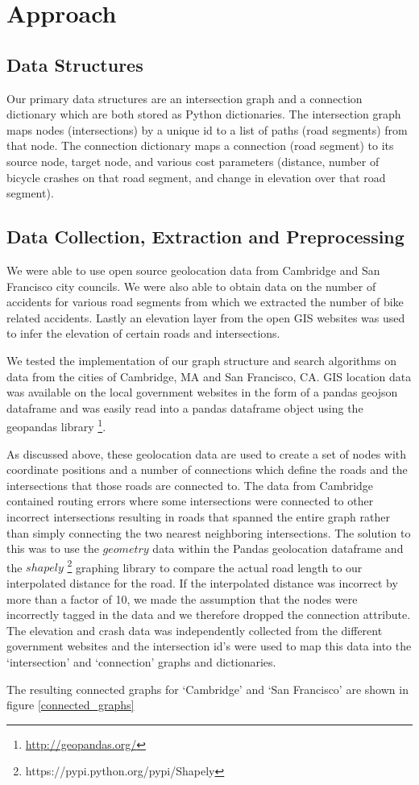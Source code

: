 \documentclass[11pt]{article}
\begin{document}
\section{Approach}
\subsection{Data Structures}
Our primary data structures are an intersection graph and a connection dictionary which are both stored as Python dictionaries. The intersection graph maps nodes (intersections) by a unique id to a list of paths (road segments) from that node. The connection dictionary maps a connection (road segment) to its source node, target node, and various cost parameters (distance, number of bicycle crashes on that road segment, and change in elevation over that road segment).

\subsection{Data Collection, Extraction and Preprocessing}
We were able to use open source geolocation data from Cambridge and San Francisco city councils. We were also able to obtain data on the number of accidents for various road segments from which we extracted the number of bike related accidents. Lastly an elevation layer from the open GIS websites was used to infer the elevation of certain roads and intersections.

We tested the implementation of our graph structure and search algorithms on data from the cities of Cambridge, MA and San Francisco, CA. GIS location data was available on the local government websites in the form of a pandas geojson dataframe and was easily read into a pandas dataframe object using the geopandas library \footnote{\url{http://geopandas.org/}}.
\par
As discussed above, these geolocation data are used to create a set of nodes with coordinate positions and a number of connections which define the roads and the intersections that those roads are connected to. The data from Cambridge contained routing errors where some intersections were connected to other incorrect intersections resulting in roads that spanned the entire graph rather than simply connecting the two nearest neighboring intersections. The solution to this was to use the $geometry$ data within the Pandas geolocation dataframe and the $shapely$ \footnote{https://pypi.python.org/pypi/Shapely} graphing library to compare the actual road length to our interpolated distance for the road. If the interpolated distance was incorrect by more than a factor of 10, we made the assumption that the nodes were incorrectly tagged in the data and we therefore dropped the connection attribute. The elevation and crash data was independently collected from the different government websites and the intersection id's were used to map this data into the `intersection' and `connection' graphs and dictionaries.
\par The resulting connected graphs for `Cambridge' and `San Francisco' are shown in figure \ref{connected_graphs}
\end{document}
